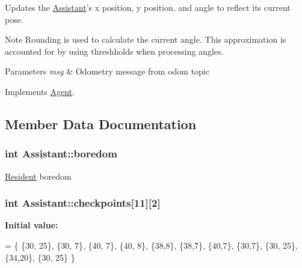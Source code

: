 Updates the \hyperlink{classAssistant}{Assistant}'s x position, y position, and angle to reflect its current pose. 

\begin{DoxyNote}{Note}
Rounding is used to calculate the current angle. This approximation is accounted for by using threshholds when processing angles. 
\end{DoxyNote}

\begin{DoxyParams}{Parameters}
{\em msg} & Odometry message from odom topic \\
\hline
\end{DoxyParams}


Implements \hyperlink{classAgent_a4b1182b9ee5dccaa871d71beef94a7d2}{Agent}.



\subsection{Member Data Documentation}
\hypertarget{classAssistant_a1f237fcda74950177c10cc26ea778863}{
\subsubsection[{boredom}]{\setlength{\rightskip}{0pt plus 5cm}int Assistant\-::boredom\hspace{0.3cm}{\ttfamily [protected]}}}\label{classAssistant_a1f237fcda74950177c10cc26ea778863}
\hyperlink{classResident}{Resident} boredom \hypertarget{classAssistant_a31e94c37f8c6509b81c5c92ad5213e3f}{
\subsubsection[{checkpoints}]{\setlength{\rightskip}{0pt plus 5cm}int Assistant\-::checkpoints\mbox{[}11\mbox{]}\mbox{[}2\mbox{]}\hspace{0.3cm}{\ttfamily [protected]}}}\label{classAssistant_a31e94c37f8c6509b81c5c92ad5213e3f}
{\bfseries Initial value\-:}
\begin{DoxyCode}
= \{  
        \{30, 25\},
        \{30, 7\}, 
        \{40, 7\},
        \{40, 8\},
        \{38,8\},
        \{38,7\},
        \{40,7\},
        \{30,7\},
        \{30, 25\},
        \{34,20\},
        \{30, 25\}
        \}
\end{DoxyCode}


